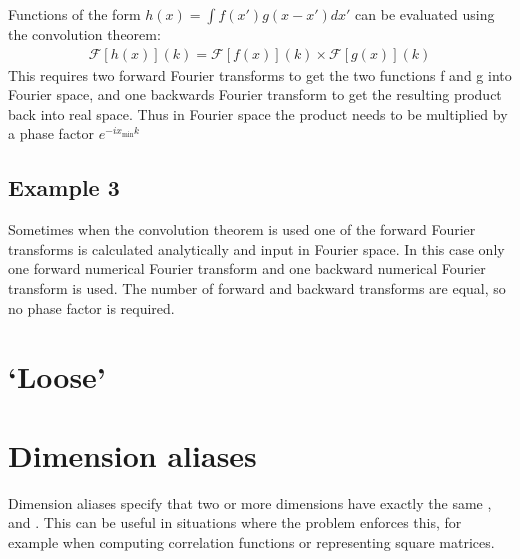 \documentclass[letterpaper,10pt,english]{sphinxmanual}
\begin{document}
\sphinxAtStartPar
Functions of the form \(h(x) = \int f(x') g(x-x') dx'\) can be evaluated using the convolution theorem:
\begin{equation*}
\begin{split}\mathcal{F}[h(x)](k) = \mathcal{F}[f(x)](k) \times \mathcal{F}[g(x)](k)\end{split}
\end{equation*}
\sphinxAtStartPar
This requires two forward Fourier transforms to get the two functions f and g into Fourier space, and one backwards Fourier transform to get the resulting product back into real space. Thus in Fourier space the product needs to be multiplied by a phase factor \(e^{-i x_\text{min} k}\)


\subsection{Example 3}
\label{\detokenize{advanced_topics:example-3}}

\sphinxAtStartPar
Sometimes when the convolution theorem is used one of the forward Fourier transforms is calculated analytically and input in Fourier space. In this case only one forward numerical Fourier transform and one backward numerical Fourier transform is used. The number of forward and backward transforms are equal, so no phase factor is required.

\ignorespaces 

\section{‘Loose’ }
\label{\detokenize{advanced_topics:loose-geometry-matching-mode}}\label{\detokenize{advanced_topics:loosegeometrymatchingmode}}\label{\detokenize{advanced_topics:index-3}}
\ignorespaces 

\section{Dimension aliases}
\label{\detokenize{advanced_topics:dimension-aliases}}\label{\detokenize{advanced_topics:dimensionaliases}}\label{\detokenize{advanced_topics:index-4}}
\sphinxAtStartPar
Dimension aliases specify that two or more dimensions have exactly the same ,  and .  This can be useful in situations where the problem enforces this, for example when computing correlation functions or representing square matrices.
\end{document}
